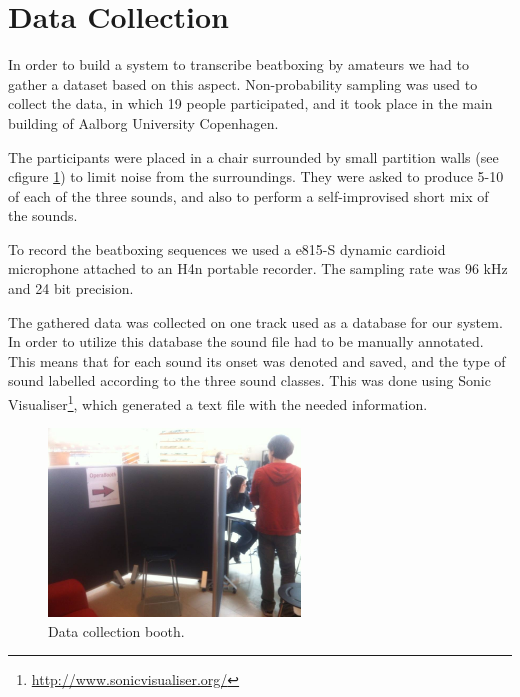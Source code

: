 \section{Data Collection}
\label{sec:data-collecting}
In order to build a system to transcribe beatboxing by amateurs we had to gather a dataset based on this aspect. 
Non-probability sampling was used to collect the data, in which 19 people participated, and it took place in the main building of Aalborg University Copenhagen. 

The participants were placed in a chair surrounded by small partition walls (see cfigure \ref{data-collection-pic}) to limit noise from the surroundings. They were asked to produce 5-10 of each of the three sounds, and also to perform a self-improvised short mix of the sounds.

To record the beatboxing sequences we used a e815-S dynamic cardioid microphone attached to an H4n portable recorder. The sampling rate was 96 kHz and 24 bit precision.

The gathered data was collected on one track used as a database for our system. In order to utilize this database the sound file had to be manually annotated. This means that for each sound its onset was denoted and saved, and the type of sound labelled according to the three sound classes. This was done using Sonic Visualiser\footnote{\url{http://www.sonicvisualiser.org/}}, which generated a text file with the needed information.

\begin{figure}[h]
	\begin{center}
		\includegraphics[height=5cm]{fig/dataset_collection.JPG}
		\caption{Data collection booth.}
		\label{data-collection-pic}
	\end{center}
\end{figure}